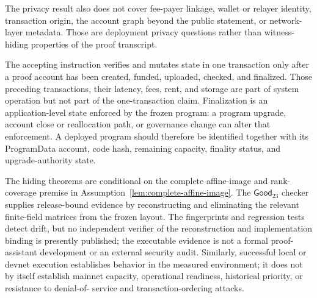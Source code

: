 The privacy result also does not cover fee-payer linkage, wallet or relayer
identity, transaction origin, the account graph beyond the public statement,
or network-layer metadata.  Those are deployment privacy questions rather
than witness-hiding properties of the proof transcript.

The accepting instruction verifies and mutates state in one transaction only
after a proof account has been created, funded, uploaded, checked, and
finalized.  Those preceding transactions, their latency, fees, rent, and
storage are part of system operation but not part of the one-transaction
claim.  Finalization is an application-level state enforced by the frozen
program: a program upgrade, account close or reallocation path, or governance
change can alter that enforcement.  A deployed program should therefore be
identified together with its ProgramData account, code hash, remaining
capacity, finality status, and upgrade-authority state.

The hiding theorems are conditional on the complete affine-image and
rank-coverage premise in Assumption~\ref{lem:complete-affine-image}.  The
\(\mathsf{Good}_{23}\) checker supplies release-bound evidence by reconstructing
and eliminating the relevant finite-field matrices from the frozen layout.
The fingerprints and regression tests detect drift, but no independent
verifier of the reconstruction and implementation binding is presently
published; the executable evidence is not a formal proof-assistant
development or an external security audit.
Similarly, successful local or devnet execution establishes behavior in the
measured environment; it does not by itself establish mainnet capacity,
operational readiness, historical priority, or resistance to denial-of-
service and transaction-ordering attacks.
